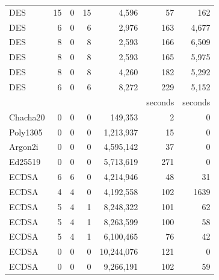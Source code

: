 \begin{table}[]
\begin{threeparttable}
{\begin{tabular}{lrrrrrr}
            DES\tnote{2}      & 15                       & 0              & 15             & 4,596       & 57      & 162     \\
            DES\tnote{4}      & 6                        & 0              & 6              & 2,976       & 163     & 4,677   \\
            DES\tnote{5}      & 8                        & 0              & 8              & 2,593       & 166     & 6,509   \\
            DES\tnote{6}      & 8                        & 0              & 8              & 2,593       & 165     & 5,975   \\
            DES\tnote{7}      & 8                        & 0              & 8              & 4,260       & 182     & 5,292   \\
            DES\tnote{8}      & 6                        & 0              & 6              & 8,272       & 229     & 5,152   \\
                              &                          &                &                &             & seconds & seconds \\\cline{6-7}
            Chacha20\tnote{3} & 0                        & 0              & 0              & 149,353     & 2       & 0       \\
            Poly1305\tnote{3} & 0                        & 0              & 0              & 1,213,937   & 15      & 0       \\
            Argon2i\tnote{3}  & 0                        & 0              & 0              & 4,595,142   & 37      & 0       \\
            Ed25519\tnote{3}  & 0                        & 0              & 0              & 5,713,619   & 271     & 0       \\
            ECDSA\tnote{1}    & 6                        & 6              & 0              & 4,214,946   & 48      & 31      \\
            ECDSA\tnote{2}    & 4                        & 4              & 0              & 4,192,558   & 102     & 1639    \\
            ECDSA\tnote{5}    & 5                        & 4              & 1              & 8,248,322   & 101     & 62      \\
            ECDSA\tnote{6}    & 5                        & 4              & 1              & 8,263,599   & 100     & 58      \\
            ECDSA\tnote{7}    & 5                        & 4              & 1              & 6,100,465   & 76      & 42      \\
            ECDSA\tnote{8}    & 0                        & 0              & 0              & 10,244,076  & 121     & 0       \\
            ECDSA\tnote{9}    & 0                        & 0              & 0              & 9,266,191   & 102     & 59      \\



\end{tabular}}
\end{threeparttable}
\end{table}
